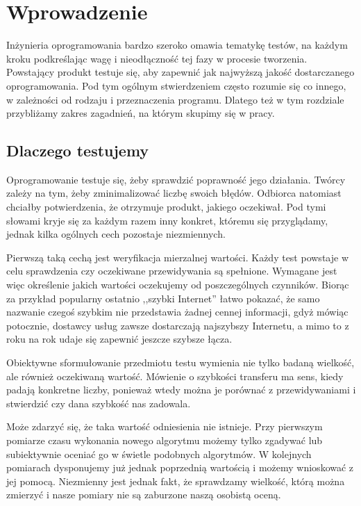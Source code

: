 \documentclass[00-praca-magisterska.tex]{subfiles}
\begin{document}
\chapter{Wprowadzenie}

Inżynieria oprogramowania bardzo szeroko omawia tematykę testów, na każdym
kroku podkreślając wagę i nieodłączność tej fazy w procesie tworzenia.
Powstający produkt testuje się, aby zapewnić jak najwyższą jakość dostarczanego
oprogramowania. Pod tym ogólnym stwierdzeniem często rozumie się co innego, w
zależności od rodzaju i przeznaczenia programu. Dlatego też w tym rozdziale
przybliżamy zakres zagadnień, na którym skupimy się w pracy.

\section{Dlaczego testujemy}

Oprogramowanie testuje się, żeby sprawdzić poprawność jego działania. Twórcy
zależy na tym, żeby zminimalizować liczbę swoich błędów. Odbiorca natomiast
chciałby potwierdzenia, że otrzymuje produkt, jakiego oczekiwał. Pod tymi
słowami kryje się za każdym razem inny konkret, któremu się przyglądamy, jednak
kilka ogólnych cech pozostaje niezmiennych.

Pierwszą taką cechą jest weryfikacja mierzalnej wartości. Każdy test powstaje w
celu sprawdzenia czy oczekiwane przewidywania są spełnione. Wymagane jest więc
określenie jakich wartości oczekujemy od poszczególnych czynników. Biorąc za
przykład popularny ostatnio ,,szybki Internet'' łatwo pokazać, że samo nazwanie
czegoś szybkim nie przedstawia żadnej cennej informacji, gdyż mówiąc potocznie,
dostawcy usług zawsze dostarczają najszybszy Internetu, a mimo to z roku na
rok udaje się zapewnić jeszcze szybsze łącza.

Obiektywne sformułowanie przedmiotu testu wymienia nie tylko badaną wielkość,
ale również oczekiwaną wartość. Mówienie o szybkości transferu ma sens, kiedy
padają konkretne liczby, ponieważ wtedy można je porównać z przewidywaniami i
stwierdzić czy dana szybkość nas zadowala.

Może zdarzyć się, że taka wartość odniesienia nie istnieje. Przy pierwszym
pomiarze czasu wykonania nowego algorytmu możemy tylko zgadywać lub subiektywnie
oceniać go w świetle podobnych algorytmów. W kolejnych pomiarach dysponujemy już
jednak poprzednią wartością i możemy wnioskować z jej pomocą.  Niezmienny jest
jednak fakt, że sprawdzamy wielkość, którą można zmierzyć i nasze pomiary nie są
zaburzone naszą osobistą oceną.
\end{document}
